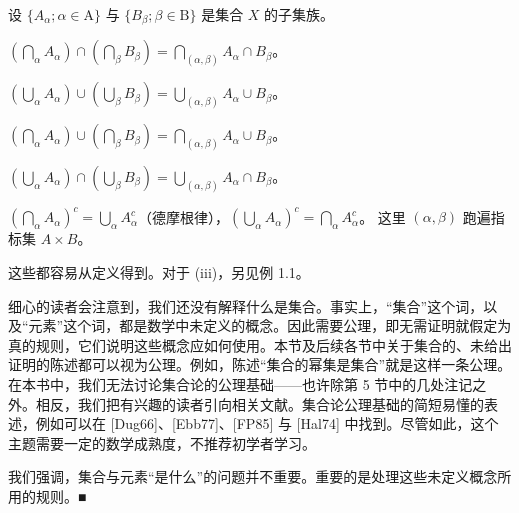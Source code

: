 \begin{proposition}

设 $\{A_\alpha; \alpha \in \mathrm{A}\}$ 与 $\{B_\beta; \beta \in \mathrm{B}\}$ 是集合 $X$ 的子集族。

\begin{subitems}
\item

$ \left(\bigcap_{\alpha}A_{\alpha}\right)\cap\left(\bigcap_{\beta}B_{\beta}\right)=\bigcap_{(\alpha,\beta)}A_{\alpha}\cap B_{\beta} $。

\item

$ \left(\bigcup_{\alpha}A_{\alpha}\right)\cup\left(\bigcup_{\beta}B_{\beta}\right)=\bigcup_{(\alpha,\beta)}A_{\alpha}\cup B_{\beta} $。

\item

$ \left(\bigcap_{\alpha}A_{\alpha}\right)\cup\left(\bigcap_{\beta}B_{\beta}\right)=\bigcap_{(\alpha,\beta)}A_{\alpha}\cup B_{\beta} $。

\item

$ \left(\bigcup_{\alpha}A_{\alpha}\right)\cap\left(\bigcup_{\beta}B_{\beta}\right)=\bigcup_{(\alpha,\beta)}A_{\alpha}\cap B_{\beta} $。

\item

$ \left(\bigcap_{\alpha} A_{\alpha}\right)^{c} = \bigcup_{\alpha} A_{\alpha}^{c} $（德摩根律），$ \left(\bigcup_{\alpha} A_{\alpha}\right)^{c} = \bigcap_{\alpha} A_{\alpha}^{c} $。
这里 $ (\alpha, \beta) $ 跑遍指标集 $ A \times B $。

\proofhead
这些都容易从定义得到。对于 (iii)，另见例 1.1。
\end{subitems}

\end{proposition}

\begin{remark}

细心的读者会注意到，我们还没有解释什么是集合。事实上，“集合”这个词，以及“元素”这个词，都是数学中未定义的概念。因此需要公理，即无需证明就假定为真的规则，它们说明这些概念应如何使用。本节及后续各节中关于集合的、未给出证明的陈述都可以视为公理。例如，陈述“集合的幂集是集合”就是这样一条公理。在本书中，我们无法讨论集合论的公理基础——也许除第 5 节中的几处注记之外。相反，我们把有兴趣的读者引向相关文献。集合论公理基础的简短易懂的表述，例如可以在 [Dug66]、[Ebb77]、[FP85] 与 [Hal74] 中找到。尽管如此，这个主题需要一定的数学成熟度，不推荐初学者学习。

我们强调，集合与元素“是什么”的问题并不重要。重要的是处理这些未定义概念所用的规则。■

\end{remark}

